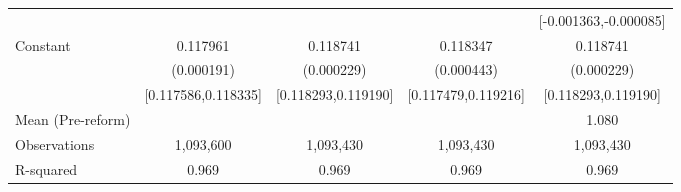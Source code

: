 {\begin{tabular}{l*{4}{c}}
                    &                     &                     &                     &[-0.001363,-0.000085]         \\
Constant            &    0.117961\sym{***}&    0.118741\sym{***}&    0.118347\sym{***}&    0.118741\sym{***}\\
                    &  (0.000191)         &  (0.000229)         &  (0.000443)         &  (0.000229)         \\
                    &[0.117586,0.118335]         &[0.118293,0.119190]         &[0.117479,0.119216]         &[0.118293,0.119190]         \\
\midrule
Mean (Pre-reform)   &                     &                     &                     &       1.080         \\
Observations        &   1,093,600         &   1,093,430         &   1,093,430         &   1,093,430         \\
R-squared           &       0.969         &       0.969         &       0.969         &       0.969         \\
\bottomrule
\end{tabular}
}
